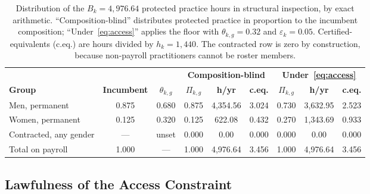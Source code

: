 \documentclass[utf8]{frontiers_suppmat}
\begin{document}
\begin{table}[!htbp]
	\caption{Distribution of the $B_k=4{,}976.64$ protected practice hours in structural inspection, by exact arithmetic. ``Composition-blind'' distributes protected practice in proportion to the incumbent composition; ``Under~\eqref{eq:access}'' applies the floor with $\theta_{k,g}=0.32$ and $\varepsilon_k=0.05$. Certified-equivalents (c.eq.) are hours divided by $h_k=1{,}440$. The contracted row is zero by construction, because non-payroll practitioners cannot be roster members.}
	\label{tab:dist}
	\footnotesize
	\setlength{\tabcolsep}{3pt}
	\begin{tabularx}{\textwidth}{@{}Xcc ccc ccc@{}}
		\toprule
		& & & \multicolumn{3}{c}{\textbf{Composition-blind}} & \multicolumn{3}{c}{\textbf{Under~\eqref{eq:access}}}\\
		\cmidrule(lr){4-6}\cmidrule(lr){7-9}
		\textbf{Group} & \textbf{Incumbent} & \textbf{$\theta_{k,g}$}
		& \textbf{$\Pi_{k,g}$} & \textbf{h/yr} & \textbf{c.eq.}
		& \textbf{$\Pi_{k,g}$} & \textbf{h/yr} & \textbf{c.eq.}\\
		\midrule
		Men, permanent & 0.875 & 0.680 & 0.875 & 4{,}354.56 & 3.024 & 0.730 & 3{,}632.95 & 2.523\\
		Women, permanent & 0.125 & 0.320 & 0.125 & 622.08 & 0.432 & 0.270 & 1{,}343.69 & 0.933\\
		Contracted, any gender & --- & unset & 0.000 & 0.00 & 0.000 & 0.000 & 0.00 & 0.000\\
		\midrule
		Total on payroll & 1.000 & --- & 1.000 & 4{,}976.64 & 3.456 & 1.000 & 4{,}976.64 & 3.456\\
		\bottomrule
	\end{tabularx}
\end{table}

\subsection{Lawfulness of the Access Constraint}
\label{app:legality}
\end{document}
